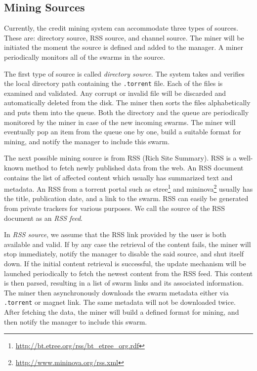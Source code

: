 \subsection{Mining Sources}
\label{section:msource} 
Currently, the credit mining system can accommodate three types of sources. These are: directory source, RSS source, and channel source. The miner will be initiated the moment the source is defined and added to the manager. A miner periodically monitors all of the swarms in the source.

The first type of source is called \textit{directory source}. The system takes and verifies the local directory path containing the \texttt{.torrent} file. Each of the files is examined and validated. Any corrupt or invalid file will be discarded and automatically deleted from the disk. The miner then sorts the files alphabetically and puts them into the queue. Both the directory and the queue are periodically monitored by the miner in case of the new incoming swarms. The miner will eventually pop an item from the queue one by one, build a suitable format for mining, and notify the manager to include this swarm.

The next possible mining source is from RSS (Rich Site Summary). RSS is a well-known method to fetch newly published data from the web. An RSS document contains the list of affected content which usually has summarized text and metadata. An RSS from a torrent portal such as etree\footnote{\url{http://bt.etree.org/rss/bt_etree_org.rdf}} and mininova\footnote{\url{http://www.mininova.org/rss.xml}} usually has the title, publication date, and a link to the swarm. RSS can easily be generated from private trackers for various purposes. We call the source of the RSS document as an \textit{RSS feed}. 

In \textit{RSS source}, we assume that the RSS link provided by the user is both available and valid. If by any case the retrieval of the content fails, the miner will stop immediately, notify the manager to disable the said source, and shut itself down. If the initial content retrieval is successful, the update mechanism will be launched periodically to fetch the newest content from the RSS feed. This content is then parsed, resulting in a list of swarm links and its associated information. The miner then asynchronously downloads the swarm metadata either via \texttt{.torrent} or magnet link. The same metadata will not be downloaded twice. After fetching the data, the miner will build a defined format for mining, and then notify the manager to include this swarm. 

